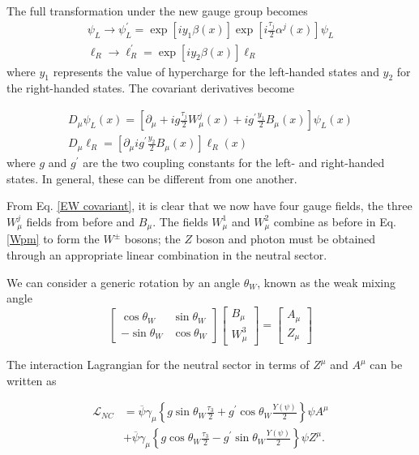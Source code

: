 \documentclass[10pt,a4paper]{book}
\begin{document}
The full transformation under the new gauge group becomes
\begin{gather}
\label{electroweak gauge transformations}
\psi_L \rightarrow \psi_L^\prime = \exp\left[iy_1\beta(x)\right]\exp\left[i\frac{\tau_j}{2} \alpha^j (x)\right]\psi_L \\
\ell_R \rightarrow \ell_R^\prime = \exp\left[iy_2\beta(x)\right]\ell_R
\end{gather}
where $y_1$ represents the value of hypercharge for the left-handed states and $y_2$ for the right-handed states.
The covariant derivatives become

\begin{gather}
\label{EW covariant}
D_\mu \psi_L(x) = \left[\partial_\mu + ig\frac{\tau_j}{2}W^j_\mu(x) + ig^\prime \frac{y_1}{2} B_\mu(x) \right]\psi_L(x) \\
D_\mu \ell_R = \left[\partial_\mu ig^\prime \frac{y_2}{2} B_\mu(x)\right]\ell_R(x)
\end{gather}
where $g$ and $g^\prime$ are the two coupling constants for the left- and right-handed states. In general, these can be different from one another.

From Eq. \ref{EW covariant}, it is clear that we now have four gauge fields, the three $W^j_\mu$ fields from before and $B_\mu$. The fields $W^1_\mu$ and $W^2_\mu$ combine as before in Eq. \ref{Wpm} to form the $W^\pm$ bosons; the $Z$ boson and photon must be obtained through an appropriate linear combination in the neutral sector.

We can consider a generic rotation by an angle $\theta_W$, known as the weak mixing angle
\begin{equation}
\label{mapping}
\begin{bmatrix}
\cos\theta_W & \sin\theta_W \\
-\sin\theta_W & \cos\theta_W
\end{bmatrix}
\begin{bmatrix}
B_\mu \\
W^3_\mu
\end{bmatrix} =
\begin{bmatrix}
A_\mu \\
Z_\mu
\end{bmatrix}
\end{equation}
 
The interaction Lagrangian for the neutral sector in terms of $Z^\mu$ and $A^\mu$ can be written as

\begin{equation}
\label{neutral current lagrangian}
\begin{aligned}
\mathcal{L}_{NC} &= \overline{\psi}\gamma_\mu\left\lbrace g \sin\theta_W \frac{\tau_3}{2} + g^\prime \cos\theta_W \frac{Y(\psi)}{2} \right\rbrace \psi A^\mu \\
&+\overline{\psi}\gamma_\mu \left\lbrace g\cos\theta_W \frac{\tau_3}{2}- g^\prime\sin\theta_W\frac{Y(\psi)}{2}\right\rbrace\psi Z^\mu.
\end{aligned}
\end{equation}
\end{document}
